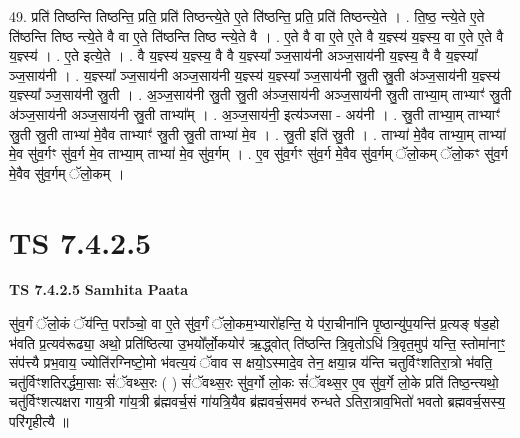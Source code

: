 \documentclass[17pt]{extarticle}
\begin{document}
49. प्रति॑ तिष्ठन्ति तिष्ठन्ति॒ प्रति॒ प्रति॑ तिष्ठन्त्ये॒ते ए॒ते ति॑ष्ठन्ति॒ प्रति॒ प्रति॑ तिष्ठन्त्ये॒ते । . ति॒ष्ठ॒ न्त्ये॒ते ए॒ते ति॑ष्ठन्ति तिष्ठ न्त्ये॒ते वै वा ए॒ते ति॑ष्ठन्ति तिष्ठ न्त्ये॒ते वै । . ए॒ते वै वा ए॒ते ए॒ते वै य॒ज्ञ्स्य॑ य॒ज्ञ्स्य॒ वा ए॒ते ए॒ते वै य॒ज्ञ्स्य॑ । . ए॒ते इत्ये॒ते । . वै य॒ज्ञ्स्य॑ य॒ज्ञ्स्य॒ वै वै य॒ज्ञ्स्या᳚ ञ्ज॒साय॑नी अञ्ज॒साय॑नी य॒ज्ञ्स्य॒ वै वै य॒ज्ञ्स्या᳚ ञ्ज॒साय॑नी । . य॒ज्ञ्स्या᳚ ञ्ज॒साय॑नी अञ्ज॒साय॑नी य॒ज्ञ्स्य॑ य॒ज्ञ्स्या᳚ ञ्ज॒साय॑नी स्रु॒ती स्रु॒ती अ॑ञ्ज॒साय॑नी य॒ज्ञ्स्य॑ य॒ज्ञ्स्या᳚ ञ्ज॒साय॑नी स्रु॒ती । . अ॒ञ्ज॒साय॑नी स्रु॒ती स्रु॒ती अ॑ञ्ज॒साय॑नी अञ्ज॒साय॑नी स्रु॒ती ताभ्या॒म् ताभ्याꣳ॑ स्रु॒ती अ॑ञ्ज॒साय॑नी अञ्ज॒साय॑नी स्रु॒ती ताभ्या᳚म् । . अ॒ञ्ज॒साय॑नी॒ इत्य॑ञ्जसा - अय॑नी । . स्रु॒ती ताभ्या॒म् ताभ्याꣳ॑ स्रु॒ती स्रु॒ती ताभ्या॑ मे॒वैव ताभ्याꣳ॑ स्रु॒ती स्रु॒ती ताभ्या॑ मे॒व । . स्रु॒ती इति॑ स्रु॒ती । . ताभ्या॑ मे॒वैव ताभ्या॒म् ताभ्या॑ मे॒व सु॑व॒र्गꣳ सु॑व॒र्ग मे॒व ताभ्या॒म् ताभ्या॑ मे॒व सु॑व॒र्गम् । . ए॒व सु॑व॒र्गꣳ सु॑व॒र्ग मे॒वैव सु॑व॒र्गम् ॅलो॒कम् ॅलो॒कꣳ सु॑व॒र्ग मे॒वैव सु॑व॒र्गम् ॅलो॒कम् । \newline
\pagebreak
{}

\section{ TS 7.4.2.5 }

\textbf{TS 7.4.2.5 } \newline
\textbf{Samhita Paata} \newline

सु॑व॒र्गं ॅलो॒कं ॅय॑न्ति॒ परा᳚ञ्चो॒ वा ए॒ते सु॑व॒र्गं ॅलो॒कम॒भ्यारो॑हन्ति॒ ये प॑रा॒चीना॑नि पृ॒ष्ठान्यु॑प॒यन्ति॑ प्र॒त्यङ् ष॑ड॒हो भ॑वति प्र॒त्यव॑रूढ्या॒ अथो॒ प्रति॑ष्ठित्या उ॒भयो᳚र्लो॒कयोर॑ ऋ॒द्ध्वोत् ति॑ष्ठन्ति त्रि॒वृतोऽधि॑ त्रि॒वृत॒मुप॑ यन्ति॒ स्तोमा॑नाꣳ॒॒ संप॑त्त्यै प्रभ॒वाय॒ ज्योति॑रग्निष्टो॒मो भ॑वत्य॒यं ॅवाव स क्षयो॒ऽस्मादे॒व तेन॒ क्षया॒न्न य॑न्ति चतुर्विꣳशतिरा॒त्रो भ॑वति॒ चतु॑र्विꣳशतिरर्द्धमा॒साः सं॑ॅवथ्स॒रः ( ) सं॑ॅवथ्स॒रः सु॑व॒र्गो लो॒कः सं॑ॅवथ्स॒र ए॒व सु॑व॒र्गे लो॒के प्रति॑ तिष्ठ॒न्त्यथो॒ चतु॑र्विꣳशत्यक्षरा गाय॒त्री गा॑य॒त्री ब्र॑ह्मवर्च॒सं गा॑यत्रि॒यैव ब्र॑ह्मवर्च॒समव॑ रुन्धते ऽतिरा॒त्राव॒भितो॑ भवतो ब्रह्मवर्च॒सस्य॒ परि॑गृहीत्यै ॥ \newline
\end{document}
